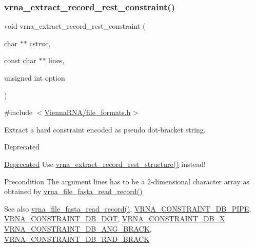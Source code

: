 \subsubsection{\texorpdfstring{vrna\+\_\+extract\+\_\+record\+\_\+rest\+\_\+constraint()}{vrna\_extract\_record\_rest\_constraint()}}
{\footnotesize\ttfamily void vrna\+\_\+extract\+\_\+record\+\_\+rest\+\_\+constraint (\begin{DoxyParamCaption}\item[{char $\ast$$\ast$}]{cstruc,  }\item[{const char $\ast$$\ast$}]{lines,  }\item[{unsigned int}]{option }\end{DoxyParamCaption})}



{\ttfamily \#include $<$\hyperlink{file__formats_8h}{Vienna\+R\+N\+A/file\+\_\+formats.\+h}$>$}



Extract a hard constraint encoded as pseudo dot-\/bracket string. 

\begin{DoxyRefDesc}{Deprecated}
\item[\hyperlink{deprecated__deprecated000066}{Deprecated}]Use \hyperlink{group__file__utils_gad37cbb63a05eed63ba25c91628409be0}{vrna\+\_\+extract\+\_\+record\+\_\+rest\+\_\+structure()} instead! \end{DoxyRefDesc}
\begin{DoxyPrecond}{Precondition}
The argument \textquotesingle{}lines\textquotesingle{} has to be a 2-\/dimensional character array as obtained by \hyperlink{group__file__utils_ga8cfb7e271efc9e1f34640acb85475639}{vrna\+\_\+file\+\_\+fasta\+\_\+read\+\_\+record()} 
\end{DoxyPrecond}
\begin{DoxySeeAlso}{See also}
\hyperlink{group__file__utils_ga8cfb7e271efc9e1f34640acb85475639}{vrna\+\_\+file\+\_\+fasta\+\_\+read\+\_\+record()}, \hyperlink{group__hard__constraints_ga13053547a2de5532b64b64d35e097ae1}{V\+R\+N\+A\+\_\+\+C\+O\+N\+S\+T\+R\+A\+I\+N\+T\+\_\+\+D\+B\+\_\+\+P\+I\+PE}, \hyperlink{group__hard__constraints_ga369bea82eae75fbe626f409fa425747e}{V\+R\+N\+A\+\_\+\+C\+O\+N\+S\+T\+R\+A\+I\+N\+T\+\_\+\+D\+B\+\_\+\+D\+OT}, \hyperlink{group__hard__constraints_ga7283bbe0f8954f7b030ecc3f2d1932b2}{V\+R\+N\+A\+\_\+\+C\+O\+N\+S\+T\+R\+A\+I\+N\+T\+\_\+\+D\+B\+\_\+X} \hyperlink{constraints__hard_8h_ad54c1315a47d55653dcaa5de6e544b77}{V\+R\+N\+A\+\_\+\+C\+O\+N\+S\+T\+R\+A\+I\+N\+T\+\_\+\+D\+B\+\_\+\+A\+N\+G\+\_\+\+B\+R\+A\+CK}, \hyperlink{group__hard__constraints_gac17b034852c914bc5879954c65d7e74b}{V\+R\+N\+A\+\_\+\+C\+O\+N\+S\+T\+R\+A\+I\+N\+T\+\_\+\+D\+B\+\_\+\+R\+N\+D\+\_\+\+B\+R\+A\+CK}
\end{DoxySeeAlso}

